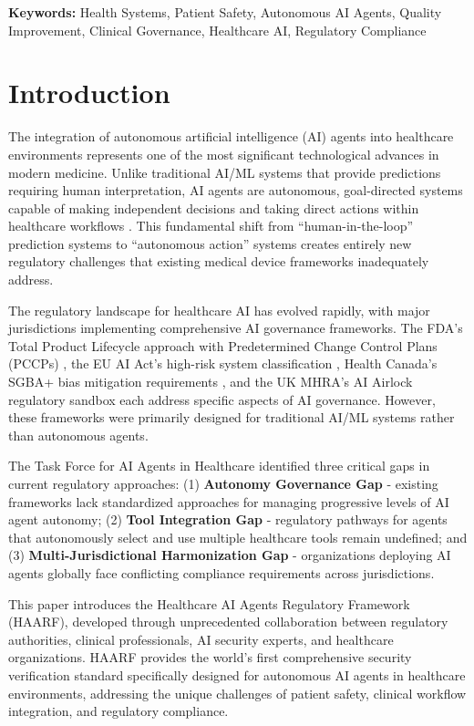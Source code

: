 \documentclass[11pt]{article}
\begin{document}
\textbf{Keywords:} Health Systems, Patient Safety, Autonomous AI Agents, Quality Improvement, Clinical Governance, Healthcare AI, Regulatory Compliance

\clearpage %

\section{Introduction}

The integration of autonomous artificial intelligence (AI) agents into healthcare environments represents one of the most significant technological advances in modern medicine. Unlike traditional AI/ML systems that provide predictions requiring human interpretation, AI agents are autonomous, goal-directed systems capable of making independent decisions and taking direct actions within healthcare workflows \cite{russell2016artificial}. This fundamental shift from ``human-in-the-loop'' prediction systems to ``autonomous action'' systems creates entirely new regulatory challenges that existing medical device frameworks inadequately address.

The regulatory landscape for healthcare AI has evolved rapidly, with major jurisdictions implementing comprehensive AI governance frameworks. The FDA's Total Product Lifecycle approach with Predetermined Change Control Plans (PCCPs) \cite{fda2021aiml}, the EU AI Act's high-risk system classification \cite{eu2024aiact}, Health Canada's SGBA+ bias mitigation requirements \cite{healthcanada2021sgba}, and the UK MHRA's AI Airlock regulatory sandbox \cite{mhra2023aiairlock} each address specific aspects of AI governance. However, these frameworks were primarily designed for traditional AI/ML systems rather than autonomous agents.

The Task Force for AI Agents in Healthcare identified three critical gaps in current regulatory approaches: (1) \textbf{Autonomy Governance Gap} - existing frameworks lack standardized approaches for managing progressive levels of AI agent autonomy; (2) \textbf{Tool Integration Gap} - regulatory pathways for agents that autonomously select and use multiple healthcare tools remain undefined; and (3) \textbf{Multi-Jurisdictional Harmonization Gap} - organizations deploying AI agents globally face conflicting compliance requirements across jurisdictions.

This paper introduces the Healthcare AI Agents Regulatory Framework (HAARF), developed through unprecedented collaboration between regulatory authorities, clinical professionals, AI security experts, and healthcare organizations. HAARF provides the world's first comprehensive security verification standard specifically designed for autonomous AI agents in healthcare environments, addressing the unique challenges of patient safety, clinical workflow integration, and regulatory compliance.
\end{document}
